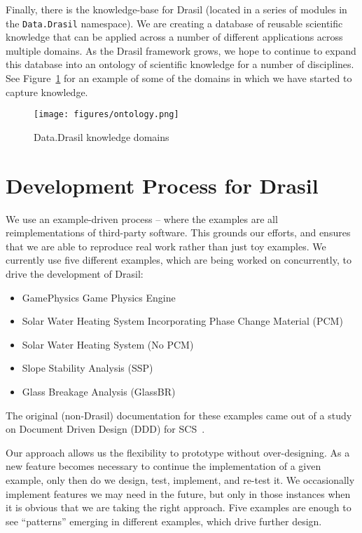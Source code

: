 \documentclass[sigconf]{acmart}
\begin{document}
Finally, there is the knowledge-base for Drasil (located in a series of
modules in the \lstinline|Data.Drasil| namespace). We 
are creating a database of reusable scientific knowledge that can be applied 
across a number of different applications across multiple domains. As the 
Drasil framework grows, we hope to continue to expand this database into an 
ontology of scientific knowledge for a number of disciplines. See 
Figure~\ref{ontology} for an example of some of the domains in which we have 
started to capture knowledge.

\begin{figure}
    \texttt{[image: figures/ontology.png]}
    \caption{Data.Drasil knowledge domains}
    \label{ontology}
\end{figure}

\section{Development Process for Drasil} \label{SecDevProcess}

We use an example-driven process -- where the examples are all reimplementations
of third-party software.  This grounds our efforts, and ensures that we are
able to reproduce real work rather than just toy examples.
We currently use five different examples, which are being worked on concurrently,
to drive the development of Drasil:

\begin{itemize}
\item GamePhysics Game Physics Engine
\item Solar Water Heating System Incorporating Phase Change Material (PCM)
\item Solar Water Heating System (No PCM)
\item Slope Stability Analysis (SSP)
\item Glass Breakage Analysis (GlassBR)
\end{itemize}
The original (non-Drasil) documentation for these examples came out of a study
on Document Driven Design (DDD) for SCS~\cite{SmithJegatheesanAndKelly2016}.

Our approach allows us the flexibility to prototype without 
over-designing. As a new feature becomes necessary to continue the 
implementation of a given example, only then do we design, test, implement, and 
re-test it. We occasionally implement features we may need in the future, but 
only in those instances when it is obvious that we are taking the right 
approach.  Five examples are enough to see ``patterns'' emerging
in different examples, which drive further design.
\end{document}
